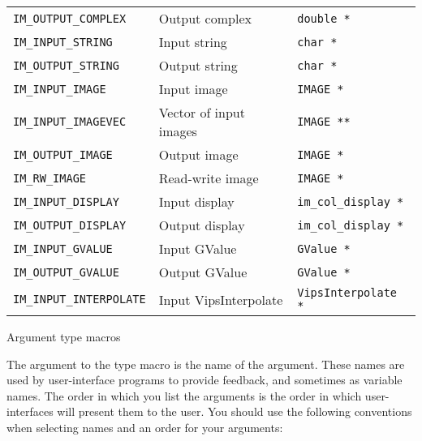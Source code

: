 \begin{tab2}
\begin{center}
\begin{tabular}{|l|l|l|}
\texttt{IM\_OUTPUT\_COMPLEX} 	& Output complex		& 
	\texttt{double *} \\

\texttt{IM\_INPUT\_STRING}	& Input string			& 
	\texttt{char *} \\
\texttt{IM\_OUTPUT\_STRING}	& Output string			& 
	\texttt{char *} \\

\texttt{IM\_INPUT\_IMAGE} 	& Input image			& 
	\texttt{IMAGE *} \\
\texttt{IM\_INPUT\_IMAGEVEC} 	& Vector of input images	& 
	\texttt{IMAGE **} \\
\texttt{IM\_OUTPUT\_IMAGE} 	& Output image			& 
	\texttt{IMAGE *} \\
\texttt{IM\_RW\_IMAGE} 		& Read-write image		& 
	\texttt{IMAGE *} \\

\texttt{IM\_INPUT\_DISPLAY}	& Input display			& 
	\texttt{im\_col\_display *} \\
\texttt{IM\_OUTPUT\_DISPLAY}	& Output display		& 
	\texttt{im\_col\_display *} \\


\texttt{IM\_INPUT\_GVALUE}	& Input GValue			& 
	\texttt{GValue *} \\
\texttt{IM\_OUTPUT\_GVALUE}	& Output GValue 		& 
	\texttt{GValue *} \\

\texttt{IM\_INPUT\_INTERPOLATE}	& Input VipsInterpolate		& 
	\texttt{VipsInterpolate *} \\
\hline
\end{tabular}
\end{center}
\caption{Argument type macros\label{tab:type}}
\end{tab2}

The argument to the type macro is the name of the argument. These names
are used by user-interface programs to provide feedback, and sometimes as
variable names. The order in which you list the arguments is the order in
which user-interfaces will present them to the user. You should use the
following conventions when selecting names and an order for your arguments:


